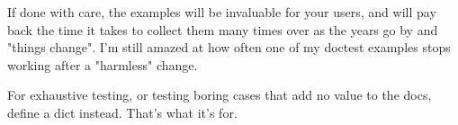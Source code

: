 If done with care, the examples will be invaluable for your users, and will
pay back the time it takes to collect them many times over as the years go
by and "things change".  I'm still amazed at how often one of my doctest
examples stops working after a "harmless" change.

For exhaustive testing, or testing boring cases that add no value to the
docs, define a  dict instead.  That's what it's for.
